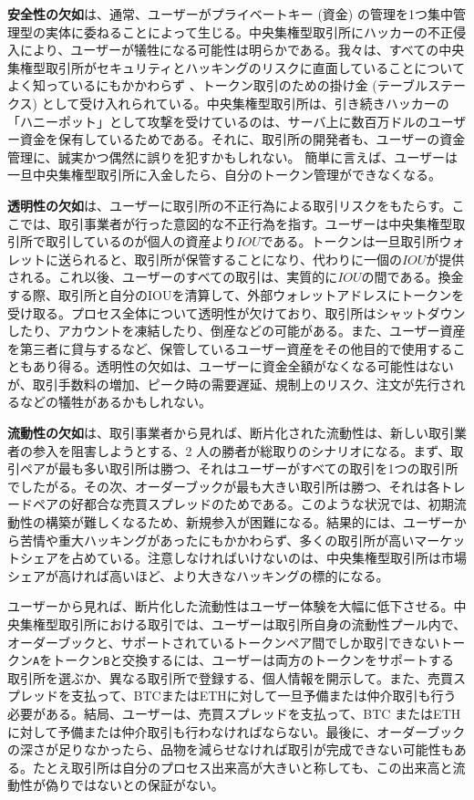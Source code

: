 \documentclass{article}
\begin{document}
\begin{multicols}{2}
\textbf{安全性の欠如}は、通常、ユーザーがプライベートキー (資金) の管理を1つ集中管理型の実体に委ねることによって生じる。中央集権型取引所にハッカーの不正侵入により、ユーザーが犠牲になる可能性は明らかである。我々は、すべての中央集権型取引所がセキュリティとハッキングのリスクに直面していることについてよく知っているにもかかわらず \cite{coincheckhack}  \cite{mcmillan2014inside} 、トークン取引のための掛け金 (テーブルステークス) として受け入れられている。中央集権型取引所は、引き続きハッカーの「ハニーポット」として攻撃を受けているのは、サーバ上に数百万ドルのユーザー資金を保有しているためである。それに、取引所の開発者も、ユーザーの資金管理に、誠実かつ偶然に誤りを犯すかもしれない。 簡単に言えば、ユーザーは一旦中央集権型取引所に入金したら、自分のトークン管理ができなくなる。

\textbf{透明性の欠如}は、ユーザーに取引所の不正行為による取引リスクをもたらす。ここでは、取引事業者が行った意図的な不正行為を指す。ユーザーは中央集権型取引所で取引しているのが個人の資産より$IOU$である。トークンは一旦取引所ウォレットに送られると、取引所が保管することになり、代わりに一個の$IOU$が提供される。これ以後、ユーザーのすべての取引は、実質的に$IOU$の間である。換金する際、取引所と自分のIOUを清算して、外部ウォレットアドレスにトークンを受け取る。プロセス全体について透明性が欠けており、取引所はシャットダウンしたり、アカウントを凍結したり、倒産などの可能がある。また、ユーザー資産を第三者に貸与するなど、保管しているユーザー資産をその他目的で使用することもあり得る。透明性の欠如は、ユーザーに資金全額がなくなる可能性はないが、取引手数料の増加、ピーク時の需要遅延、規制上のリスク、注文が先行されるなどの犠牲があるかもしれない。

\textbf{流動性の欠如}は、取引事業者から見れば、断片化された流動性は、新しい取引業者の参入を阻害しようとする、2 人の勝者が総取りのシナリオになる。まず、取引ペアが最も多い取引所は勝つ、それはユーザーがすべての取引を1つの取引所でしたがる。その次、オーダーブックが最も大きい取引所は勝つ、それは各トレードペアの好都合な売買スプレッドのためである。このような状況では、初期流動性の構築が難しくなるため、新規参入が困難になる。結果的には、ユーザーから苦情や重大ハッキングがあったにもかかわらず、多くの取引所が高いマーケットシェアを占めている。注意しなければいけないのは、中央集権型取引所は市場シェアが高ければ高いほど、より大きなハッキングの標的になる。

ユーザーから見れば、断片化した流動性はユーザー体験を大幅に低下させる。中央集権型取引所における取引では、ユーザーは取引所自身の流動性プール内で、オーダーブックと、サポートされているトークンペア間でしか取引できないトークン\verb|A|をトークン\verb|B|と交換するには、ユーザーは両方のトークンをサポートする取引所を選ぶか、異なる取引所で登録する、個人情報を開示して。また、売買スプレッドを支払って、BTCまたはETHに対して一旦予備または仲介取引も行う必要がある。結局、ユーザーは、売買スプレッドを支払って、BTC またはETHに対して予備または仲介取引も行わなければならない。最後に、オーダーブックの深さが足りなかったら、品物を減らせなければ取引が完成できない可能性もある。たとえ取引所は自分のプロセス出来高が大きいと称しても、この出来高と流動性が偽りではないとの保証がない\cite{fakevolume}。


\end{multicols}
\end{document}
